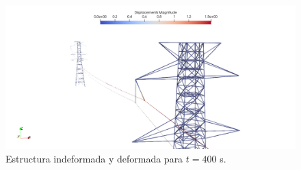\begin{figure}[htbp]
	\centering
	\includegraphics[width=120mm]{./imagenes/ResultadosNumericos/TransmissionTormenta/Deformadas.png}
	\caption{Estructura indeformada y deformada para $t=400$ s.}
	\label{fig:RN:Transmission:Deformadas}
\end{figure} 
